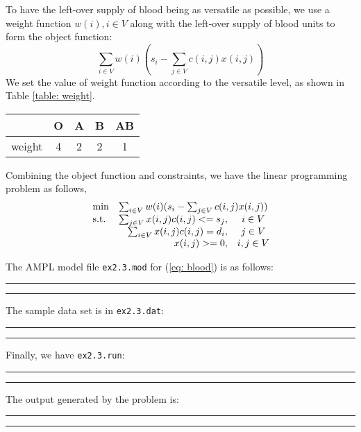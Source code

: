 To have the left-over supply of blood being as versatile as possible, we use a weight function $w(i),i\in V$ along with the left-over supply of blood units to form the object function:
\begin{equation}
\label{eq: obj}
   \sum_{i\in V} w(i)(s_i-\sum_{j\in V} c(i,j)x(i,j))
\end{equation}
We set the value of weight function according to the versatile level, as shown in Table \ref{table: weight}.
\begin{table*}[!h]
\centering
\small
\begin{tabular}{|c|c|c|c|c|}
\hline
 & O & A & B & AB \\
\hline
weight& 4 & 2 & 2 & 1\\
\hline
\end{tabular}
\caption{Weight function value setting according to blood versatile level}
\label{table: weight}
\end{table*}

Combining the object function and constraints, we have the linear programming problem as follows,
\begin{equation}
\label{eq: blood}
  \begin{array}{lrcll}
    \min
    & \multicolumn{4}{l}{\sum_{i\in V} w(i)(s_i-\sum_{j\in V} c(i,j)x(i,j))} \\
    \text{s.t.}
    & \sum_{j\in V} x(i,j)c(i,j)<= s_j,& i\in V\\
    & \sum_{i\in V} x(i,j)c(i,j) = d_i,& j\in V\\
    & x(i,j)>=0, & i,j\in V
  \end{array}
\end{equation}

The AMPL model file {\tt ex2.3.mod} for (\ref{eq: blood}) is as follows:

\bigskip
\hrule
\small

\normalsize
\hrule
\bigskip

The sample data set is in {\tt ex2.3.dat}:

\bigskip
\hrule
\small

\normalsize
\hrule
\bigskip

Finally, we have {\tt ex2.3.run}:

\bigskip
\hrule
\small

\normalsize
\hrule
\bigskip

The output generated by the problem is:

\bigskip
\hrule
\small

\normalsize
\hrule
\bigskip

